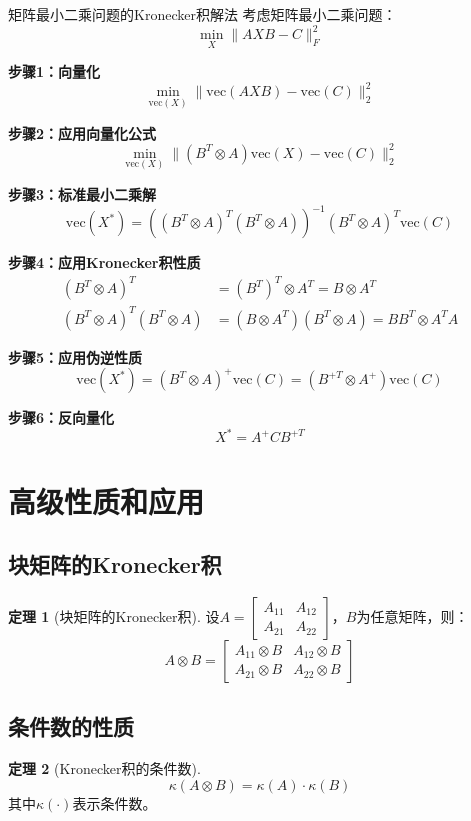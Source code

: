 \documentclass[11pt,a4paper]{ctexart}
\theoremstyle{definition}
\newtheorem{theorem}{定理}[section]
\newcommand{\vect}{\text{vec}}
\begin{document}
\begin{computation}{矩阵最小二乘问题的Kronecker积解法}
考虑矩阵最小二乘问题：
$$\min_X \|AXB - C\|_F^2$$

\textbf{步骤1：向量化}
$$\min_{\vect(X)} \|\vect(AXB) - \vect(C)\|_2^2$$

\textbf{步骤2：应用向量化公式}
$$\min_{\vect(X)} \|(B^T \otimes A)\vect(X) - \vect(C)\|_2^2$$

\textbf{步骤3：标准最小二乘解}
$$\vect(X^*) = ((B^T \otimes A)^T(B^T \otimes A))^{-1}(B^T \otimes A)^T\vect(C)$$

\textbf{步骤4：应用Kronecker积性质}
\begin{align}
(B^T \otimes A)^T &= (B^T)^T \otimes A^T = B \otimes A^T \\
(B^T \otimes A)^T(B^T \otimes A) &= (B \otimes A^T)(B^T \otimes A) = BB^T \otimes A^TA
\end{align}

\textbf{步骤5：应用伪逆性质}
$$\vect(X^*) = (B^T \otimes A)^+ \vect(C) = (B^{+T} \otimes A^+) \vect(C)$$

\textbf{步骤6：反向量化}
$$X^* = A^+ C B^{+T}$$
\end{computation}

\section{高级性质和应用}

\subsection{块矩阵的Kronecker积}

\begin{theorem}[块矩阵的Kronecker积]
设$A = \begin{bmatrix} A_{11} & A_{12} \\ A_{21} & A_{22} \end{bmatrix}$，$B$为任意矩阵，则：
$$A \otimes B = \begin{bmatrix} A_{11} \otimes B & A_{12} \otimes B \\ A_{21} \otimes B & A_{22} \otimes B \end{bmatrix}$$
\end{theorem}

\subsection{条件数的性质}

\begin{theorem}[Kronecker积的条件数]
$$\kappa(A \otimes B) = \kappa(A) \cdot \kappa(B)$$
其中$\kappa(\cdot)$表示条件数。
\end{theorem}
\end{document}
